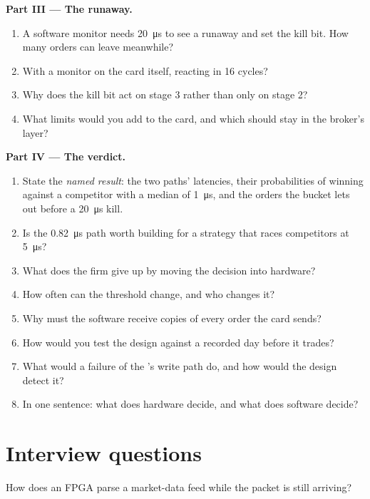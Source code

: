 \begin{problem}
\medskip\noindent\textbf{Part III --- The runaway.}
\begin{enumerate}[resume]
\item A software monitor needs \qty{20}{\micro\second} to see a runaway and set the kill bit. How many orders can leave meanwhile?
\item With a monitor on the card itself, reacting in 16 cycles?
\item Why does the kill bit act on stage 3 rather than only on stage 2?
\item What limits would you add to the card, and which should stay in the broker's layer?
\end{enumerate}

\medskip\noindent\textbf{Part IV --- The verdict.}
\begin{enumerate}[resume]
\item State the \emph{named result}: the two paths' latencies, their probabilities of winning against a competitor with a median of
  \qty{1}{\micro\second}, and the orders the bucket lets out before a \qty{20}{\micro\second} kill.
\item Is the \qty{0.82}{\micro\second} path worth building for a strategy that races competitors at \qty{5}{\micro\second}?
\item What does the firm give up by moving the decision into hardware?
\item How often can the threshold change, and who changes it?
\item Why must the software receive copies of every order the card sends?
\item How would you test the design against a recorded day before it trades?
\item What would a failure of the 's write path do, and how would the design detect it?
\item In one sentence: what does hardware decide, and what does software decide?
\end{enumerate}
\end{problem}

\section{Interview questions}

\begin{interviewq}\label{iq:nw:programmable-hardware-ii-trading-designs:1}
How does an FPGA parse a market-data feed while the packet is still arriving?
\end{interviewq}

